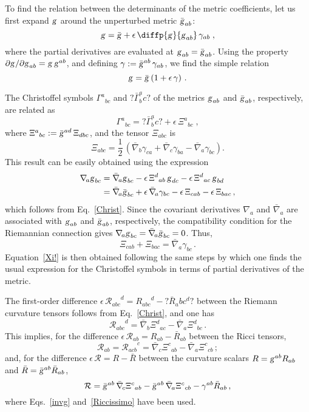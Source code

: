 \documentclass[a4paper,showkeys,aps,prd,reprint,nofootinbib,showpacs,twocolumn]{revtex4-1}
\newcommand{\ton}[1]{\left(#1\right)}
\newcommand{\eq}[1]{\( #1 \)}
\newcommand{\eqd}[1]{\begin{equation} #1 \end{equation}}
\newcommand{\speq}[1]{\begin{equation}\begin{split}#1\end{split}\end{equation}}
\newcommand{\Cal}[1]{\mathcal{#1}}
\newcommand{\matg}{\text{\textsl{g}}}%
\theoremstyle{plain}
\begin{document}
To find the relation between the determinants of the metric coefficients, let us first expand \eq{\matg} around the unperturbed metric \eq{\bar{\matg}_{ab}}:
%
\eqd{\matg = \bar{\matg} + \epsilon \, \diffp{\matg}{{{\matg_{ab}}}} \, \gamma_{ab} \;,}
%
where the partial derivatives are evaluated at \eq{\matg_{ab} = \bar{\matg}_{ab}}.  
Using the property \eq{{\partial \matg}/{\partial \matg_{ab}} = \matg \, \matg^{ab}}, and defining \eq{\gamma := \bar{\matg}^{ab} \, \gamma_{ab}}, we find the simple relation
%
\eqd{\matg = \bar{\matg} \ton{1 + \epsilon \, \gamma} \,. \label{ggbar}}
%

The Christoffel symbols \eq{{\Gamma^a}_{bc}} and \eq{?{{{\bar{\Gamma}}}}^a_bc?} of the metrics \eq{\matg_{ab}} and \eq{\bar{\matg}_{ab}}, respectively, are related as
%
\eqd{{\Gamma^a}_{bc} = ?{{{\bar{\Gamma}}}}^a_bc? + \epsilon \, {\Xi^a}_{bc}\;, \label{Christ}}
%
where \eq{{\Xi^a}_{bc}:=\bar{\matg}^{ad} \, \Xi_{dbc}}, and the tensor \eq{\Xi_{abc}} is
%
\eqd{\Xi_{abc} = \frac{1}{2} \, \left(\bar{\nabla}_{\! b} \gamma_{ca} + \bar{\nabla}_{\! c} \gamma_{ba} - \bar{\nabla}_{\! a} \gamma_{bc}\right). \label{Xi!}}
%
This result can be easily obtained using the expression 
%
\speq{\nabla_{\! a} \matg_{bc} &= \bar{\nabla}_{\! a} \matg_{bc} - \epsilon \, {\Xi^d}_{ab} \, \matg_{dc} - \epsilon \, {\Xi^d}_{ac} \, \matg_{bd} \\
&= \bar{\nabla}_{\! a} \bar{\matg}_{bc} + \epsilon \, \bar{\nabla}_{\! a} \gamma_{bc} - \epsilon \, \Xi_{cab} - \epsilon \, \Xi_{bac} \,,}
%
which follows from Eq.~\eqref{Christ}.  Since the covariant derivatives \eq{\nabla_{\! a}} and \eq{\bar{\nabla}_{\! a}} are associated with \eq{\matg_{ab}} and \eq{\bar{\matg}_{ab}}, respectively, the compatibility condition for the Riemannian connection gives \eq{\nabla_{\! a} \matg_{bc} = \bar{\nabla}_{\! a} \bar{\matg}_{bc} = 0}.  Thus, 
%
\eqd{\Xi_{cab} + \Xi_{bac} = \bar{\nabla}_{\! a} \gamma_{bc} \,.}
%
Equation~\eqref{Xi!} is then obtained following the same steps by which one finds the usual expression for the Christoffel symbols in terms of partial derivatives of the metric.

The first-order difference \eq{\epsilon \, {\Cal{R}_{abc}}^d = {R_{abc}}^d - ?{{{\bar{R}}}}_abc^d?} between the Riemann curvature tensors follows from Eq.~\eqref{Christ}, and one has
%
\eqd{{\Cal{R}_{abc}}^d = \bar{\nabla}_{\! b} {\Xi^d}_{ac} - \bar{\nabla}_{\! a} {\Xi^d}_{bc} \,.}
%
This implies, for the difference \eq{\epsilon \, \Cal{R}_{ab} = R_{ab} - \bar{R}_{ab}} between the Ricci tensors,
%
\eqd{\Cal{R}_{ab} = {\Cal{R}_{acb}}^c = \bar{\nabla}_{\! c} {\Xi^c}_{ab} - \bar{\nabla}_{\! a} {\Xi^c}_{cb} \,; \label{Riccissimo}}
%
and, for the difference \eq{\epsilon \, \Cal{R} = R - \bar{R}} between the curvature scalars \eq{R = \matg^{ab} R_{ab}} and \eq{\bar{R} = \bar{\matg}^{ab} \bar{R}_{ab}},
%
\eqd{\Cal{R} = \bar{\matg}^{ab} \, \bar{\nabla}_{\! c} {\Xi^c}_{ab} - \bar{\matg}^{ab} \, \bar{\nabla}_{\! a} {\Xi^c}_{cb} - \gamma^{ab} \bar{R}_{ab} \,,}
%
where Eqs.~\eqref{invg} and~\eqref{Riccissimo} have been used.  
\end{document}
